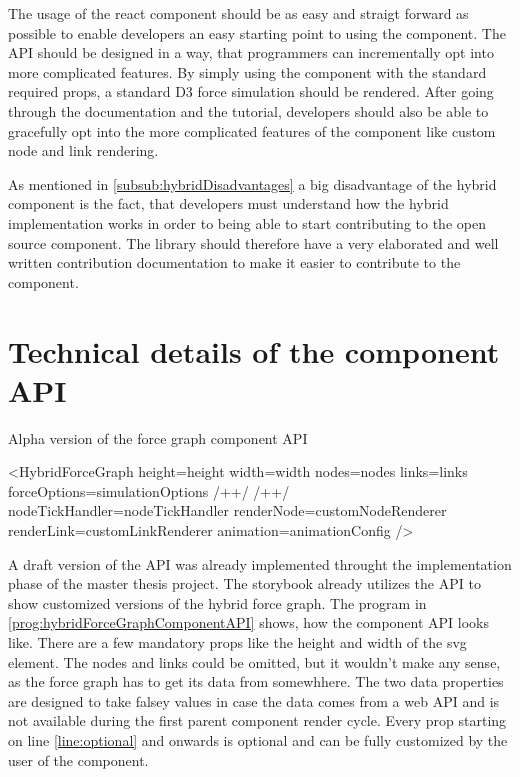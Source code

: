 The usage of the react component should be as easy and straigt forward as possible to enable developers an easy starting point to using the component. The API should be designed in a way, that programmers can incrementally opt into more complicated features. By simply using the component with the standard required props, a standard D3 force simulation should be rendered. After going through the documentation and the tutorial, developers should also be able to gracefully opt into the more complicated features of the component like custom node and link rendering.

As mentioned in \ref{subsub:hybridDisadvantages} a big disadvantage of the hybrid component is the fact, that developers must understand how the hybrid implementation works in order to being able to start contributing to the open source component. The library should therefore have a very elaborated and well written contribution documentation to make it easier to contribute to the component.

\section{Technical details of the component API}

\begin{program}
\caption{Alpha version of the force graph component API}
\label{prog:hybridForceGraphComponentAPI}
\begin{JsCode}
<HybridForceGraph 
  height={height}
  width={width}
  nodes={nodes}
  links={links}
  forceOptions={simulationOptions} /+\label{line:foceOptions}+/ /+\label{line:optional}+/ 
  nodeTickHandler={nodeTickHandler}
  renderNode={customNodeRenderer}
  renderLink={customLinkRenderer}
  animation={animationConfig}
/>
\end{JsCode}
\end{program}

A draft version of the API was already implemented throught the implementation phase of the master thesis project. The storybook already utilizes the API to show customized versions of the hybrid force graph. The program in \ref{prog:hybridForceGraphComponentAPI} shows, how the component API looks like. There are a few mandatory props like the height and width of the svg element. The nodes and links could be omitted, but it wouldn't make any sense, as the force graph has to get its data from somewhhere. The two data properties are designed to take falsey values in case the data comes from a web API and is not available during the first parent component render cycle. Every prop starting on line \ref{line:optional} and onwards is optional and can be fully customized by the user of the component.

